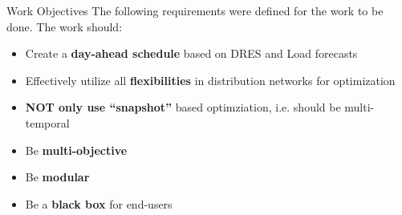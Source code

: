 \documentclass[xcolor=svgnames,aspectratio=32,8pt]{beamer}
\begin{document}
\begin{frame}
  {Work Objectives}
  The following requirements were defined for the work to be done. The work should:\\
  \vspace{0.2cm}
  \begin{itemize}
  \item Create a \textbf{day-ahead schedule} based on DRES and Load forecasts \pause
  \vspace{0.2cm}
  \item Effectively utilize all  \textbf{flexibilities} in distribution networks for optimization \pause
  \vspace{0.2cm}
  \item \textbf{NOT only use ``snapshot''} based optimziation, i.e. should be multi-temporal \pause
  \vspace{0.2cm}
  \item Be \textbf{multi-objective} \pause
  \vspace{0.2cm}
  \item Be \textbf{modular} \pause
  \vspace{0.2cm}
  \item Be a \textbf{black box} for end-users
  \end{itemize}
\end{frame}

\end{document}
